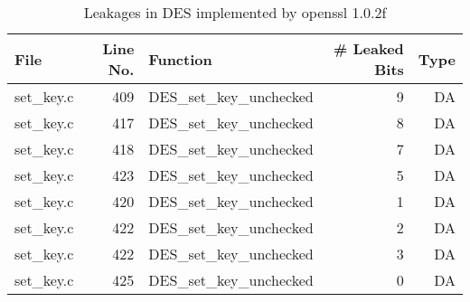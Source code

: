 \begin{table}[h!]
\centering\tiny\scriptsize
\renewcommand{\baselinestretch}{0.96}\selectfont
\caption{Leakages in DES implemented by openssl 1.0.2f}\label{tab:DESopenssl1.0.2f}
\begin{tabular}{lrlrr}
\hline
\textbf{File} & \textbf{Line No.} & \textbf{Function} & \textbf{\# Leaked Bits} & \textbf{Type} \\\hline
set\_key.c& 409&DES\_set\_key\_unchecked&9 &DA\\
set\_key.c& 417&DES\_set\_key\_unchecked&8 &DA\\
set\_key.c& 418&DES\_set\_key\_unchecked&7 &DA\\
set\_key.c& 423&DES\_set\_key\_unchecked&5 &DA\\
set\_key.c& 420&DES\_set\_key\_unchecked&1 &DA\\
set\_key.c& 422&DES\_set\_key\_unchecked&2 &DA\\
set\_key.c& 422&DES\_set\_key\_unchecked&3 &DA\\
set\_key.c& 425&DES\_set\_key\_unchecked&0 &DA\\
\hline
\end{tabular}
\renewcommand{\baselinestretch}{1.0}\selectfont
\end{table}
